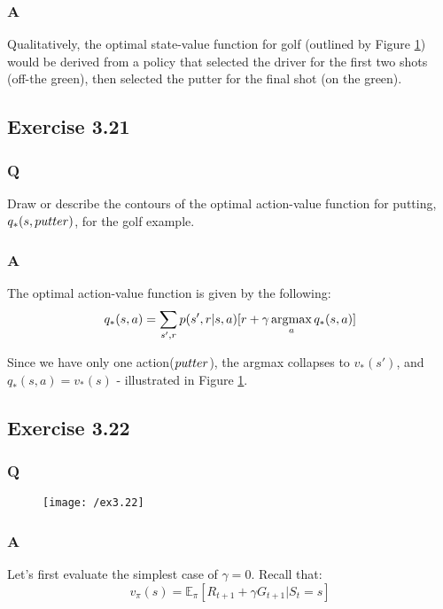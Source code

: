 \subsubsection*{A}
Qualitatively, the optimal state-value function for golf (outlined by Figure \ref{fig:3.20}) would be derived from a policy that selected the driver for the first two shots (off-the green), then selected the putter for the final shot (on the green).

\subsection{Exercise 3.21}
\subsubsection*{Q}
Draw or describe the contours of the optimal action-value function for putting, $q_*(s, \mathnormal{putter})$, for the golf example.

\subsubsection*{A}
The optimal action-value function is given by the following:
\begin{equation}
q_*(s,a)= \sum_{s', r} p(s', r | s, a) [r + \gamma \operatorname*{\arg\!\max}_a q_*(s,a)]
\end{equation}

Since we have only one action($\mathnormal{putter}$), the argmax collapses to $v_*(s')$, and $q_*(s,a) = v_*(s)$ - illustrated in Figure \ref{fig:3.20}.

\subsection{Exercise 3.22}
\subsubsection*{Q}
\begin{figure}[h!]
	\centering
	\texttt{[image: /ex3.22]}
	\label{fig:3.20}
\end{figure}

\subsubsection*{A}
Let's first evaluate the simplest case of $\gamma = 0$. Recall that:
\begin{equation}
v_\pi(s) = \mathbb{E}_\pi[R_{t+1} + \gamma G_{t+1} | S_t = s]
\end{equation}

